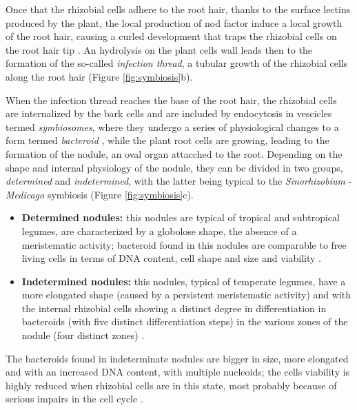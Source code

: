 Once that the rhizobial cells adhere to the root hair, thanks to the surface lectins produced by the plant, the local production of nod factor induce a local growth of the root hair, causing a curled development that traps the rhizobial cells on the root hair tip \cite{diaz1986correlation}. An hydrolysis on the plant cells wall leads then to the formation of the so-called \textit{infection thread}, a tubular growth of the rhizobial cells along the root hair (Figure \ref{fig:symbiosis}b).

When the infection thread reaches the base of the root hair, the rhizobial cells are internalized by the bark cells and are included by endocytosis in vescicles termed \textit{symbiosomes}, where they undergo a series of physiological changes to a form termed \textit{bacteroid} \cite{brewin2004plant}, while the plant root cells are growing, leading to the formation of the nodule, an oval organ attacched to the root. Depending on the shape and internal physiology of the nodule, they can be divided in two groups, \textit{determined} and \textit{indetermined}, with the latter being typical to the \textit{Sinorhizobium} - \textit{Medicago} symbiosis (Figure \ref{fig:symbiosis}c).

\begin{itemize}
\item \textbf{Determined nodules:} this nodules are typical of tropical and subtropical legumes, are characterized by a globolose shape, the absence of a meristematic activity; bacteroid found in this nodules are comparable to free living cells in terms of DNA content, cell shape and size and viability \cite{brewin1991development}\cite{franssen1992developmental}\cite{mergaert2006eukaryotic}.
\item \textbf{Indetermined nodules:} this nodules, typical of temperate legumes, have a more elongated shape (caused by a persistent meristematic activity) and with the internal rhizobial cells showing a distinct degree in differentiation in bacteroids (with five distinct differentiation steps) in the various zones of the nodule (four distinct zones) \cite{patriarca2002key}\cite{pawlowski1996rhizobial}\cite{vasse1990correlation}.
\end{itemize}

The bacteroids found in indeterminate nodules are bigger in size, more elongated and with an increased DNA content, with multiple nucleoids; the cells viability is highly reduced when rhizobial cells are in this state, most probably because of serious impairs in the cell cycle \cite{mergaert2006eukaryotic}.

